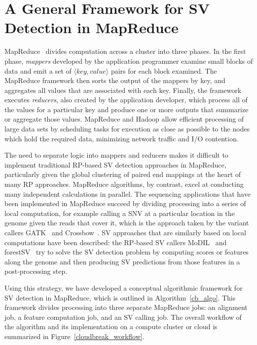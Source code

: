 \chapter{A General Framework for SV Detection in MapReduce}\label{chap_framework}

MapReduce~\cite{Dean:2008p277} divides computation across a cluster into three phases. In the first phase, \emph{mappers} developed by the application programmer examine small blocks of data and emit a set of $\langle key, value \rangle$ pairs for each block examined. The MapReduce framework then sorts the output of the mappers by key, and aggregates all values that are associated with each key. Finally, the framework executes \emph{reducers}, also created by the application developer, which process all of the values for a particular key and produce one or more outputs that summarize or aggregate those values. MapReduce and Hadoop allow efficient processing of large data sets by scheduling tasks for execution as close as possible to the nodes which hold the required data, minimizing network traffic and I/O contention.

The need to separate logic into mappers and reducers makes it difficult to implement traditional RP-based SV detection approaches in MapReduce, particularly given the global clustering of paired end mappings at the heart of many RP approaches. MapReduce algorithms, by contrast, excel at conducting many independent calculations in parallel. The sequencing applications that have been implemented in MapReduce succeed by dividing processing into a series of local computation, for example calling a SNV at a particular location in the genome given the reads that cover it, which is the approach taken by the variant callers GATK~\cite{McKenna:2010p1051} and Crossbow~\cite{Langmead:2009p1225}. SV approaches that are similarly based on local computations have been described: the RP-based SV callers MoDIL~\cite{Lee:2009da} and forestSV~\cite{Michaelson:2012fj} try to solve the SV detection problem by computing scores or features along the genome and then producing SV predictions from those features in a post-processing step. 

Using this strategy, we have developed a conceptual algorithmic framework for SV detection in MapReduce, which is outlined in Algorithm~\ref{cb_algo}. This framework divides processing into three separate MapReduce jobs: an alignment job, a feature computation job, and an SV calling job. The overall workflow of the algorithm and its implementation on a compute cluster or cloud is summarized in Figure~\ref{cloudbreak_workflow}.

